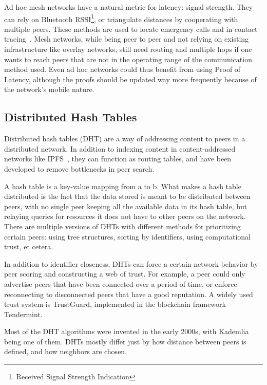 Ad hoc mesh networks have a natural metric for latency: signal strength. They can rely on Bluetooth RSSI\footnote{Received Signal Strength Indication}, or triangulate distances by cooperating with multiple peers. These methods are used to locate emergency calls and in contact tracing~\cite{Biddle2020-kl}. Mesh networks, while being peer to peer and not relying on existing infrastructure like overlay networks, still need routing and multiple hops if one wants to reach peers that are not in the operating range of the communication method used. Even ad hoc networks could thus benefit from using Proof of Latency, although the proofs should be updated way more frequently because of the network's mobile nature.

\subsection{Distributed Hash Tables}
Distributed hash tables (DHT) are a way of addressing content to peers in a distributed network. In addition to indexing content in content-addressed networks like IPFS~\cite{Labs_undated-uw}, they can function as routing tables, and have been developed to remove bottlenecks in peer search.

A hash table is a key-value mapping from a to b. What makes a hash table distributed is the fact that the data stored is meant to be distributed between peers, with no single peer keeping all the available data in its hash table, but relaying queries for resources it does not have to other peers on the network. There are multiple versions of DHTs with different methods for prioritizing certain peers: using tree structures, sorting by identifiers, using computational trust, et cetera.

In addition to identifier closeness, DHTs can force a certain network behavior by peer scoring and constructing a web of trust. For example, a peer could only advertise peers that have been connected over a period of time, or enforce reconnecting to disconnected peers that have a good reputation. A widely used trust system is TrustGuard, implemented in the blockchain framework Tendermint.~\cite{Srivatsa2005-ib, Jeff_Foley2018-zt}

Most of the DHT algorithms were invented in the early 2000s, with Kademlia being one of them. DHTs mostly differ just by how distance between peers is defined, and how neighbors are chosen.~\cite{Cai2015-ra}

